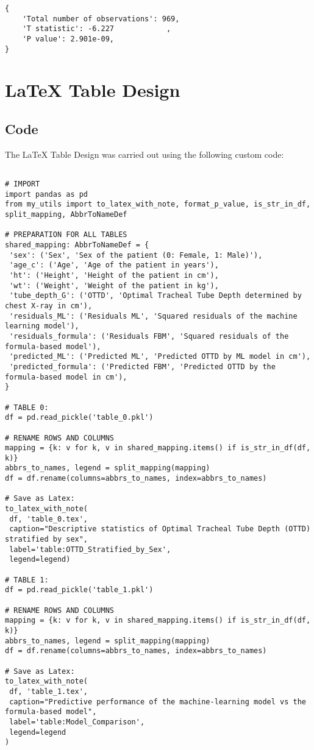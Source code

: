\documentclass[11pt]{article}
\begin{document}
\begin{Verbatim}[tabsize=4]
{
    'Total number of observations': 969,
    'T statistic': -6.227            ,
    'P value': 2.901e-09,
}
\end{Verbatim}

\section{LaTeX Table Design}
\subsection{{Code}}
The LaTeX Table Design was carried out using the following custom code:

\begin{verbatim}

# IMPORT
import pandas as pd
from my_utils import to_latex_with_note, format_p_value, is_str_in_df, split_mapping, AbbrToNameDef

# PREPARATION FOR ALL TABLES
shared_mapping: AbbrToNameDef = {
 'sex': ('Sex', 'Sex of the patient (0: Female, 1: Male)'),
 'age_c': ('Age', 'Age of the patient in years'),
 'ht': ('Height', 'Height of the patient in cm'),
 'wt': ('Weight', 'Weight of the patient in kg'),
 'tube_depth_G': ('OTTD', 'Optimal Tracheal Tube Depth determined by chest X-ray in cm'),
 'residuals_ML': ('Residuals ML', 'Squared residuals of the machine learning model'),
 'residuals_formula': ('Residuals FBM', 'Squared residuals of the formula-based model'),
 'predicted_ML': ('Predicted ML', 'Predicted OTTD by ML model in cm'),
 'predicted_formula': ('Predicted FBM', 'Predicted OTTD by the formula-based model in cm'),
}

# TABLE 0:
df = pd.read_pickle('table_0.pkl')

# RENAME ROWS AND COLUMNS
mapping = {k: v for k, v in shared_mapping.items() if is_str_in_df(df, k)}
abbrs_to_names, legend = split_mapping(mapping)
df = df.rename(columns=abbrs_to_names, index=abbrs_to_names)

# Save as Latex:
to_latex_with_note(
 df, 'table_0.tex',
 caption="Descriptive statistics of Optimal Tracheal Tube Depth (OTTD) stratified by sex",
 label='table:OTTD_Stratified_by_Sex',
 legend=legend)

# TABLE 1:
df = pd.read_pickle('table_1.pkl')

# RENAME ROWS AND COLUMNS
mapping = {k: v for k, v in shared_mapping.items() if is_str_in_df(df, k)} 
abbrs_to_names, legend = split_mapping(mapping)
df = df.rename(columns=abbrs_to_names, index=abbrs_to_names)

# Save as Latex:
to_latex_with_note(
 df, 'table_1.tex',
 caption="Predictive performance of the machine-learning model vs the formula-based model",
 label='table:Model_Comparison',
 legend=legend
)

\end{verbatim}
\end{document}
